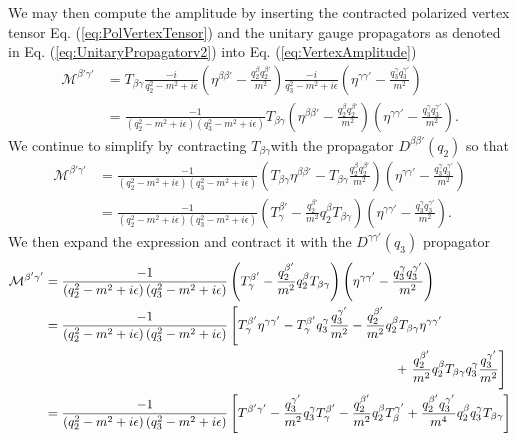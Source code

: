 \documentclass[12pt]{article}
\numberwithin{figure}{section}
\numberwithin{table}{section}
\newcommand{\eps}{\epsilon}
\newcommand{\paren}[1]{\left(#1\right)}
\newcommand{\bracket}[1]{\left[#1\right]}
\newcommand{\p}[1]{\left(#1\right)}
\begin{document}
We may then compute the amplitude by inserting the contracted polarized vertex tensor Eq. (\ref{eq:PolVertexTensor}) and the unitary gauge propagators as denoted in Eq. (\ref{eq:UnitaryPropagatorv2}) into Eq. (\ref{eq:VertexAmplitude})
\begin{align*}
  \mathcal{M}^{\beta'\gamma'}  &=
        T_{\beta\gamma}  \frac{-i}{q_2^2-m^2+i\epsilon}\p{\eta^{\beta\beta'}-\frac{q_2^\beta q_2^{\beta'}}{m^2}}
    \frac{-i}{q_3^2-m^2+i\epsilon}\p{\eta^{\gamma\gamma'}-\frac{q_3^\gamma q_3^{\gamma'}}{m^2}}\\
    &= \frac{-1}{\p{q_2^2-m^2+i\eps}\paren{q_3^2-m^2+i\eps}}T_{\beta\gamma} \p{\eta^{\beta\beta'}-\frac{q_2^\beta q_2^{\beta'}}{m^2}}\p{\eta^{\gamma\gamma'}-\frac{q_3^\gamma q_3^{\gamma'}}{m^2}}.
\end{align*}
We continue to simplify by contracting $T_{\beta\gamma} $with the propagator $ D^{\beta\beta'}(q_2)$ so that
\begin{align*}
   \mathcal{M}^{\beta'\gamma'}
    &=\frac{-1}{\p{q_2^2-m^2+i\eps}\paren{q_3^2-m^2+i\eps}}\paren{T_{\beta\gamma}\eta^{\beta\beta'} -T_{\beta\gamma}\frac{q_2^\beta q_2^{\beta'}}{m^2}}\p{\eta^{\gamma\gamma'}-\frac{q_3^\gamma q_3^{\gamma'}}{m^2}}\\
  &=\frac{-1}{\p{q_2^2-m^2+i\eps}\paren{q_3^2-m^2+i\eps}}\paren{ T^{\beta'}_\gamma - \frac{q_2^{\beta'}}{m^2}q_2^\beta T_{\beta\gamma}}\p{\eta^{\gamma\gamma'}-\frac{q_3^\gamma q_3^{\gamma'}}{m^2}}.
\end{align*}
We then expand the expression and contract it with the $D^{\gamma\gamma'}(q_3)$ propagator
\begin{align*}
     \mathcal{M}^{\beta'\gamma'}
    &= \frac{-1}{\p{q_2^2-m^2+i\eps}\paren{q_3^2-m^2+i\eps}}\paren{ T^{\beta'}_\gamma - \frac{q_2^{\beta'}}{m^2}q_2^\beta T_{\beta\gamma}}\p{\eta^{\gamma\gamma'}-\frac{q_3^\gamma q_3^{\gamma'}}{m^2}}\\
    &= \frac{-1}{\p{q_2^2-m^2+i\eps}\paren{q_3^2-m^2+i\eps}} \left[T_\gamma^{\beta'}\eta^{\gamma\gamma'} -  T_\gamma^{\beta'}q^\gamma_3\frac{ q_3^{\gamma'}}{m^2}- \frac{q_2^{\beta'}}{m^2}q_2^\beta T_{\beta\gamma}\eta^{\gamma\gamma'} \right.
    \\& \hspace{9.5cm}+\left. \frac{q_2^{\beta'}}{m^2}q_2^\beta T_{\beta\gamma} q^\gamma_3\frac{ q_3^{\gamma'}}{m^2}\right]\\
    &=    \frac{-1}{\p{q_2^2-m^2+i\eps}\paren{q_3^2-m^2+i\eps}} \bracket{T^{\beta'\gamma'} -  \frac{ q_3^{\gamma'}}{m^2}q^\gamma_3T_\gamma^{\beta'}- \frac{q_2^{\beta'}}{m^2}q_2^\beta T_{\beta}^{\gamma'}  + \frac{q_2^{\beta'}q_3^{\gamma'}}{m^4}q_2^\beta q^\gamma_3 T_{\beta\gamma} }
\end{align*}
\end{document}
